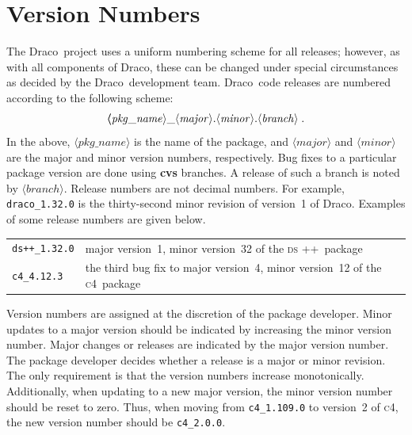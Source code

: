 \documentclass[11pt]{nmemo}
\newcommand{\draco}{{\normalfont\normalsize\textsf Draco}}
\newcommand{\cfour}{{\normalfont\normalsize\scshape c\small 4}}
\newcommand{\dsxx}{{\normalfont\normalsize\scshape ds\raisebox{.2ex}
  {\scriptsize ++}}}
\begin{document}

\section{Version Numbers}

The \draco\ project uses a uniform numbering scheme for all releases;
however, as with all components of \draco, these can be changed under
special circumstances as decided by the \draco\ development team.
\draco\ code releases are numbered according to the following scheme:
\begin{equation}
  \boldsymbol
  \langle\mathit{pkg\_name}\rangle\_
  \langle\mathit{major}\rangle.
  \langle\mathit{minor}\rangle.
  \langle\mathit{branch}\rangle\; .
  \notag
\end{equation}
In the above, $\langle\mathit{pkg\_name}\rangle$ is the name of the
package, and $\langle\mathit{major}\rangle$ and
$\langle\mathit{minor}\rangle$ are the major and minor version
numbers, respectively. Bug fixes to a particular package version are
done using {\bf cvs} branches.  A release of such a branch is noted by
$\langle\mathit{branch}\rangle$.  Release numbers are not decimal
numbers.  For example, \texttt{draco\_1.32.0} is the thirty-second
minor revision of version~1 of \draco.  Examples of some release
numbers are given below.
\begin{center}
  \begin{tabular}{ll}
    \texttt{ds++\_1.32.0} & major version~1, minor version~32 of the
    \dsxx\ package \\
    \texttt{c4\_4.12.3} & the third bug fix to major version~4, minor
    version~12 of the \cfour\ package \\
  \end{tabular}
\end{center}

Version numbers are assigned at the discretion of the package
developer.  Minor updates to a major version should be indicated by
increasing the minor version number.  Major changes or releases are
indicated by the major version number.  The package developer decides
whether a release is a major or minor revision.  The only requirement
is that the version numbers increase monotonically.  Additionally,
when updating to a new major version, the minor version number should
be reset to zero.  Thus, when moving from \texttt{c4\_1.109.0} to
version~2 of \cfour, the new version number should be
\texttt{c4\_2.0.0}.
\end{document}
